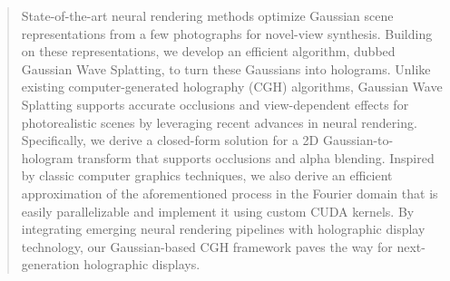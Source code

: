 \documentclass[acmtog,nonacm]{acmart}
\begin{document}
\begin{abstract}
State-of-the-art neural rendering methods optimize Gaussian scene representations from a few photographs for novel-view synthesis. Building on these representations, we develop an efficient algorithm, dubbed Gaussian Wave Splatting, to turn these Gaussians into holograms. Unlike existing computer-generated holography (CGH) algorithms, Gaussian Wave Splatting supports accurate occlusions and view-dependent effects for photorealistic scenes by leveraging recent advances in neural rendering.  
%
Specifically, we derive a closed-form solution for a 2D Gaussian-to-hologram transform that supports occlusions and alpha blending. Inspired by classic computer graphics techniques, we also derive an efficient approximation of the aforementioned process in the Fourier domain that is easily parallelizable and implement it using custom CUDA kernels. 
%
By integrating emerging neural rendering pipelines with holographic display technology, our Gaussian-based CGH framework paves the way for next-generation holographic displays.
%
\end{abstract}
\end{document}

